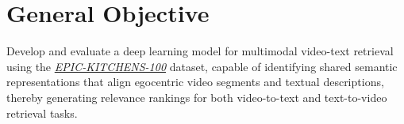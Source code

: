 \section{General Objective}

Develop and evaluate a deep learning model for multimodal video-text retrieval using the \href{https://epic-kitchens.github.io/}{\textit{EPIC-KITCHENS-100}} dataset, capable of identifying shared semantic representations that align egocentric video segments and textual descriptions, thereby generating relevance rankings for both video-to-text and text-to-video retrieval tasks.
